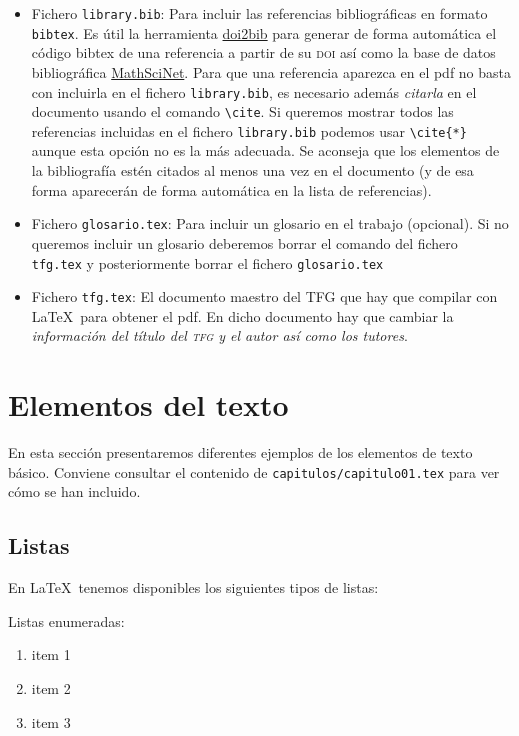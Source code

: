 \begin{itemize}
    \item Fichero \texttt{library.bib}: Para incluir las referencias bibliográficas en formato \texttt{bibtex}. Es útil la herramienta \href{https://www.doi2bib.org/}{doi2bib} para generar de forma automática el código bibtex de una referencia a partir de su \textsc{doi}  así como la base de datos bibliográfica \href{https://mathscinet.ams.org}{MathSciNet}. Para que una referencia aparezca en el pdf no basta con incluirla en el fichero \texttt{library.bib}, es necesario además \emph{citarla} en el documento usando el comando \verb+\cite+. Si queremos mostrar todos las referencias incluidas en el fichero \texttt{library.bib} podemos usar \verb+\cite{*}+ aunque esta opción no es la más adecuada. Se aconseja que los elementos de la bibliografía estén citados al menos una vez en el documento (y de esa forma aparecerán de forma automática en la lista de referencias).

    \item Fichero \texttt{glosario.tex}: Para incluir un glosario en el trabajo (opcional). Si no queremos incluir un glosario deberemos borrar el comando \verb++ del fichero \texttt{tfg.tex} y posteriormente borrar el fichero \texttt{glosario.tex}

  \item Fichero \texttt{tfg.tex}: El documento maestro del TFG que hay que compilar con \LaTeX\ para obtener el pdf. En dicho documento hay que cambiar la \emph{información del título del \textsc{tfg} y el autor así como los tutores}.
\end{itemize}

\section{Elementos del texto}

En esta sección presentaremos diferentes ejemplos de los elementos de texto básico. Conviene consultar el contenido de \texttt{capitulos/capitulo01.tex} para ver cómo se han incluido.

\subsection{Listas}
En \LaTeX\ tenemos disponibles los siguientes tipos de listas:

Listas enumeradas:
\begin{enumerate}
  \item item 1
  \item item 2
  \item item 3
\end{enumerate}

